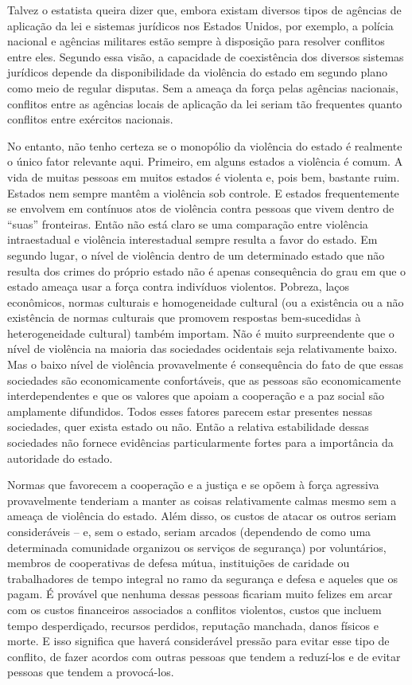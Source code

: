 Talvez o estatista queira dizer que, embora existam diversos tipos de agências de aplicação da lei e sistemas jurídicos nos Estados Unidos, por exemplo, a polícia nacional e agências militares estão sempre à disposição para resolver conflitos entre eles. Segundo essa visão, a capacidade de coexistência dos diversos sistemas jurídicos depende da disponibilidade da violência do estado em segundo plano como meio de regular disputas. Sem a ameaça da força pelas agências nacionais, conflitos entre as agências locais de aplicação da lei seriam tão frequentes quanto conflitos entre exércitos nacionais.

No entanto, não tenho certeza se o monopólio da violência do estado é realmente o único fator relevante aqui. Primeiro, em alguns estados a violência é comum. A vida de muitas pessoas em muitos estados é violenta e, pois bem, bastante ruim. Estados nem sempre mantêm a violência sob controle. E estados frequentemente se envolvem em contínuos atos de violência contra pessoas que vivem dentro de ``suas'' fronteiras. Então não está claro se uma comparação entre violência intraestadual e violência interestadual sempre resulta a favor do estado. Em segundo lugar, o nível de violência dentro de um determinado estado que não resulta dos crimes do próprio estado não é apenas consequência do grau em que o estado ameaça usar a força contra indivíduos violentos. Pobreza, laços econômicos, normas culturais e homogeneidade cultural (ou a existência ou a não existência de normas culturais que promovem respostas bem-sucedidas à heterogeneidade cultural) também importam. Não é muito surpreendente que o nível de violência na maioria das sociedades ocidentais seja relativamente baixo. Mas o baixo nível de violência provavelmente é consequência do fato de que essas sociedades são economicamente confortáveis, que as pessoas são economicamente interdependentes e que os valores que apoiam a cooperação e a paz social são amplamente difundidos. Todos esses fatores parecem estar presentes nessas sociedades, quer exista estado ou não. Então a relativa estabilidade dessas sociedades não fornece evidências particularmente fortes para a importância da autoridade do estado.

Normas que favorecem a cooperação e a justiça e se opõem à força agressiva provavelmente tenderiam a manter as coisas relativamente calmas mesmo sem a ameaça de violência do estado. Além disso, os custos de atacar os outros seriam consideráveis -- e, sem o estado, seriam arcados (dependendo de como uma determinada comunidade organizou os serviços de segurança) por voluntários, membros de cooperativas de defesa mútua, instituições de caridade ou trabalhadores de tempo integral no ramo da segurança e defesa e aqueles que os pagam. É provável que nenhuma dessas pessoas ficariam muito felizes em arcar com os custos financeiros associados a conflitos violentos, custos que incluem tempo desperdiçado, recursos perdidos, reputação manchada, danos físicos e morte. E isso significa que haverá considerável pressão para evitar esse tipo de conflito, de fazer acordos com outras pessoas que tendem a reduzí-los e de evitar pessoas que tendem a provocá-los.

